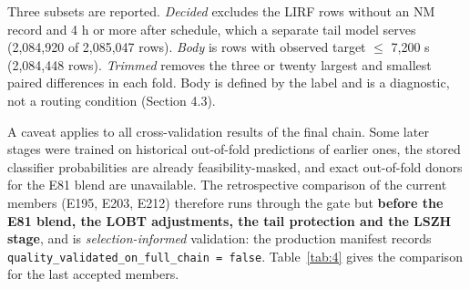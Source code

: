 \documentclass[11pt,a4paper]{article}
\begin{document}
Three subsets are reported. \emph{Decided} excludes the LIRF rows without an NM record and 4 h or more after schedule, which a separate tail model serves (2,084,920 of 2,085,047 rows). \emph{Body} is rows with observed target $\le$ 7,200 s (2,084,448 rows). \emph{Trimmed} removes the three or twenty largest and smallest paired differences in each fold. Body is defined by the label and is a diagnostic, not a routing condition (Section 4.3).

A caveat applies to all cross-validation results of the final chain. Some later stages were trained on historical out-of-fold predictions of earlier ones, the stored classifier probabilities are already feasibility-masked, and exact out-of-fold donors for the E81 blend are unavailable. The retrospective comparison of the current members (E195, E203, E212) therefore runs through the gate but \textbf{before the E81 blend, the LOBT adjustments, the tail protection and the LSZH stage}, and is \emph{selection-informed} validation: the production manifest records \texttt{quality\_\allowbreak{}validated\_\allowbreak{}on\_\allowbreak{}full\_\allowbreak{}chain\ =\ false}. Table~\ref{tab:4} gives the comparison for the last accepted members.
\end{document}
